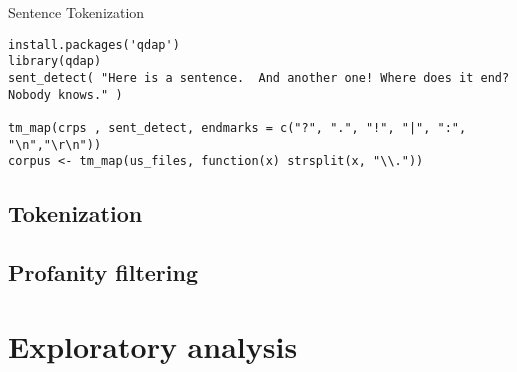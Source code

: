 \documentclass{article}
\begin{document}
Sentence Tokenization

\begin{lstlisting}
install.packages('qdap')
library(qdap)
sent_detect( "Here is a sentence.  And another one! Where does it end? Nobody knows." )

tm_map(crps , sent_detect, endmarks = c("?", ".", "!", "|", ":", "\n","\r\n"))
corpus <- tm_map(us_files, function(x) strsplit(x, "\\."))

\end{lstlisting}


\subsection{Tokenization}

\subsection{Profanity filtering}



\section{Exploratory analysis}
\end{document}
